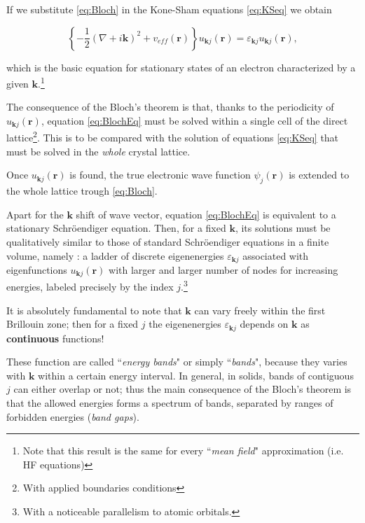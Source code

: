 \documentclass[a4paper,12pt]{article}
\newcommand\mf[1]{\mathbf{#1}}
\newcommand\erre{\mathbf{r}}
\begin{document}
If we substitute \eqref{eq:Bloch} in the Kone-Sham equations \eqref{eq:KSeq} we obtain \cite[p.137]{Manini}
\begin{framed}
\begin{equation}\label{eq:BlochEq}
	\left\lbrace -\frac{1}{2}  \left( \nabla + i\mf{k} \right)^2 + v_{eff}(\erre) \right\rbrace u_{\mf{k}j}(\erre) = \varepsilon_{\mf{k}j}  u_{\mf{k}j}(\erre),
\end{equation}
\end{framed}
which is the basic equation for stationary states of an electron characterized by a given $\mf{k}$.\footnote{Note that this result is the same for every ``\textit{mean field}" approximation (i.e. HF equations)}

The consequence of the Bloch's theorem is that, thanks to the periodicity of $u_{\mf{k}j}(\erre)$, equation \eqref{eq:BlochEq} must be solved within a single cell of the direct lattice\footnote{With applied boundaries conditions}.
This is to be compared with the solution of equations \eqref{eq:KSeq} that must be solved in the \textit{whole} crystal lattice.

Once $u_{\mf{k}j}(\erre)$ is found, the true electronic wave function $\psi_j(\erre)$ is extended to the whole lattice trough \eqref{eq:Bloch}.

Apart for the $\mf{k}$ shift of wave vector, equation \eqref{eq:BlochEq} is equivalent to a stationary Schr\"oendiger equation. Then, for a fixed $\mf{k}$, its solutions must be qualitatively similar to those of standard Schr\"oendiger equations in a finite volume, namely : a ladder of discrete eigenenergies $\varepsilon_{\mf{k}j}$ associated with eigenfunctions $u_{\mf{k}j}(\erre)$ with larger and larger number of nodes for increasing energies, labeled precisely by the index $j$.\footnote{With a noticeable parallelism to atomic orbitals.}

It is absolutely fundamental to note that $\mf{k}$ can vary freely within the first Brillouin zone; 
then for a fixed $j$ the eigenenergies $\varepsilon_{\mf{k}j}$ depends on $\mf{k}$ as \textbf{continuous} functions!

These function are called ``\textit{energy bands}" or simply ``\textit{bands}", because they varies with $\mf{k}$ within a certain energy interval. 
In general, in solids, bands of contiguous $j$ can either overlap or not; 
thus the main consequence of the Bloch's theorem is that the allowed energies forms a spectrum of bands, separated by ranges of forbidden energies (\textit{band gaps}).
\end{document}
